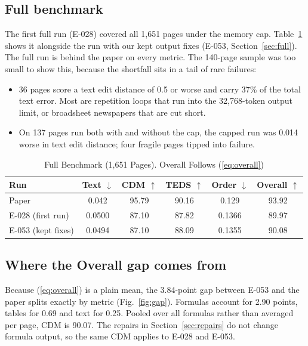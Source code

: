 \documentclass[journal]{IEEEtran}
\begin{document}
\subsection{Full benchmark}

The first full run (E-028) covered all 1,651 pages under the memory cap.
Table~\ref{tab:full} shows it alongside the run with our kept output fixes
(E-053, Section~\ref{sec:full}). The full run is behind the paper on every
metric. The 140-page sample was too small to show this, because the shortfall
sits in a tail of rare failures:

\begin{itemize}
\item 36 pages score a text edit distance of 0.5 or worse and carry 37\% of the
total text error. Most are repetition loops that run into the 32,768-token
output limit, or broadsheet newspapers that are cut short.
\item On 137 pages run both with and without the cap, the capped run was 0.014
worse in text edit distance; four fragile pages tipped into failure.
\end{itemize}

\begin{table}[!t]
\caption{Full Benchmark (1,651 Pages). Overall Follows (\ref{eq:overall})}
\label{tab:full}
\centering
\footnotesize
\setlength{\tabcolsep}{4pt}
\begin{tabular}{@{}lccccc@{}}
\toprule
Run & Text $\downarrow$ & CDM $\uparrow$ & TEDS $\uparrow$ & Order $\downarrow$ & Overall $\uparrow$ \\
\midrule
Paper & 0.042 & 95.79 & 90.16 & 0.129 & 93.92 \\
E-028 (first run) & 0.0500 & 87.10 & 87.82 & 0.1366 & 89.97 \\
E-053 (kept fixes) & 0.0494 & 87.10 & 88.09 & 0.1355 & 90.08 \\
\bottomrule
\end{tabular}
\end{table}

\subsection{Where the Overall gap comes from}

Because (\ref{eq:overall}) is a plain mean, the 3.84-point gap between E-053 and
the paper splits exactly by metric (Fig.~\ref{fig:gap}). Formulas account for
2.90 points, tables for 0.69 and text for 0.25. Pooled over all formulas rather
than averaged per page, CDM is 90.07. The repairs in Section~\ref{sec:repairs}
do not change formula output, so the same CDM applies to E-028 and E-053.
\end{document}
